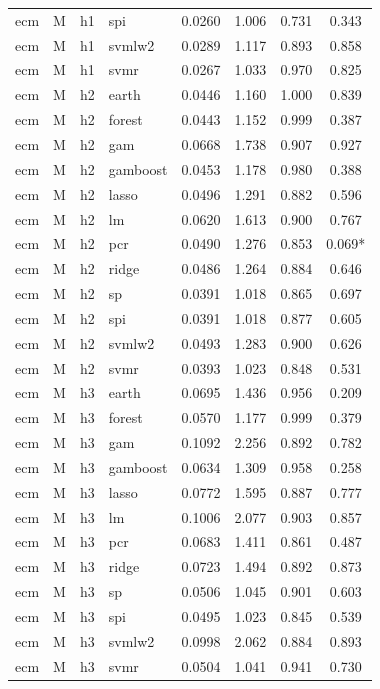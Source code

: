 \begin{ThreePartTable}
\begin{longtable}[t]{llclcccc}
ecm & M & h1 & spi & 0.0260 & 1.006 & 0.731 & 0.343\\
ecm & M & h1 & svmlw2 & 0.0289 & 1.117 & 0.893 & 0.858\\
ecm & M & h1 & svmr & 0.0267 & 1.033 & 0.970 & 0.825\\
\addlinespace
ecm & M & h2 & earth & 0.0446 & 1.160 & 1.000 & 0.839\\
ecm & M & h2 & forest & 0.0443 & 1.152 & 0.999 & 0.387\\
ecm & M & h2 & gam & 0.0668 & 1.738 & 0.907 & 0.927\\
ecm & M & h2 & gamboost & 0.0453 & 1.178 & 0.980 & 0.388\\
ecm & M & h2 & lasso & 0.0496 & 1.291 & 0.882 & 0.596\\
ecm & M & h2 & lm & 0.0620 & 1.613 & 0.900 & 0.767\\
ecm & M & h2 & pcr & 0.0490 & 1.276 & 0.853 & 0.069*\\
ecm & M & h2 & ridge & 0.0486 & 1.264 & 0.884 & 0.646\\
ecm & M & h2 & sp & 0.0391 & 1.018 & 0.865 & 0.697\\
ecm & M & h2 & spi & 0.0391 & 1.018 & 0.877 & 0.605\\
ecm & M & h2 & svmlw2 & 0.0493 & 1.283 & 0.900 & 0.626\\
ecm & M & h2 & svmr & 0.0393 & 1.023 & 0.848 & 0.531\\
\addlinespace
ecm & M & h3 & earth & 0.0695 & 1.436 & 0.956 & 0.209\\
ecm & M & h3 & forest & 0.0570 & 1.177 & 0.999 & 0.379\\
ecm & M & h3 & gam & 0.1092 & 2.256 & 0.892 & 0.782\\
ecm & M & h3 & gamboost & 0.0634 & 1.309 & 0.958 & 0.258\\
ecm & M & h3 & lasso & 0.0772 & 1.595 & 0.887 & 0.777\\
ecm & M & h3 & lm & 0.1006 & 2.077 & 0.903 & 0.857\\
ecm & M & h3 & pcr & 0.0683 & 1.411 & 0.861 & 0.487\\
ecm & M & h3 & ridge & 0.0723 & 1.494 & 0.892 & 0.873\\
ecm & M & h3 & sp & 0.0506 & 1.045 & 0.901 & 0.603\\
ecm & M & h3 & spi & 0.0495 & 1.023 & 0.845 & 0.539\\
ecm & M & h3 & svmlw2 & 0.0998 & 2.062 & 0.884 & 0.893\\
ecm & M & h3 & svmr & 0.0504 & 1.041 & 0.941 & 0.730\\

\end{longtable}
\end{ThreePartTable}
